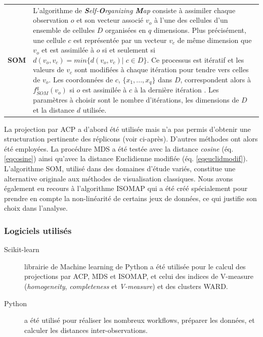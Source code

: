\begin{longtable}{ @{\hspace{-2.2cm}} >{\bfseries}p{}|>{\small}p{} }
\\[0.4cm]
      \textbf{SOM} & L'algorithme de \textit{\textbf{S}elf-\textbf{O}rganizing \textbf{M}ap} \citep{Kohonen1982} consiste à assimiler chaque observation $o$ et son vecteur associé $v_{o}$ à l'une des cellules d'un ensemble de cellules $D$ organisées en $q$ dimensions. Plus précisément, une cellule $c$ est représentée par un vecteur $v_{c}$ de même dimension que $v_{o}$ et est assimilée à $o$ si et seulement si $d(v_{o},v_{c})=min\{d(v_{o},v_{c})|\; c \in D\}$. Ce processus est itératif et les valeurs de $v_{c}$ sont modifiées à chaque itération pour tendre vers celles de $v_{o}$. Les coordonnées de $c$, $\{x_{1},...,x_{q}\}$ dans $D$, correspondent alors à $f_{SOM}^{q}(v_{o})$ si $o$ est assimilée à $c$ à la dernière itération \citep{izenman2008modern}. Les paramètres à choisir sont le nombre d'itérations, les dimensions de $D$ et la distance $d$ utilisée.
      \end{longtable}
      
      La projection par ACP a d'abord été utilisée mais n’a pas permis d’obtenir une structuration pertinente des réplicons (voir ci-après). D’autres méthodes ont alors été employées. La procédure MDS a été testée avec la distance \textit{cosine} (éq. \ref{eqcosine}) ainsi qu’avec la distance Euclidienne modifiée (éq. \ref{eqeuclidmodif}). L'algorithme SOM, utilisé dans des domaines d’étude variés, constitue une alternative originale aux méthodes de visualisation classiques. Nous avons également eu recours à l'algorithme ISOMAP qui a été créé spécialement pour prendre en compte la non-linéarité de certains jeux de données, ce qui justifie son choix dans l'analyse.

\subsubsection{Logiciels utilisés}
 \begin{description}
 \item[Scikit-learn] librairie de Machine learning de Python a été utilisée pour le calcul des projections par ACP, MDS et ISOMAP, et celui des indices de V-measure (\textit{homogeneity}, \textit{completeness} et \textit{V-measure}) et des clusters WARD.
 \item[Python] a été utilisé pour réaliser les nombreux workflows, préparer les données, et calculer les distances inter-observations. 
 \end{description}
           
